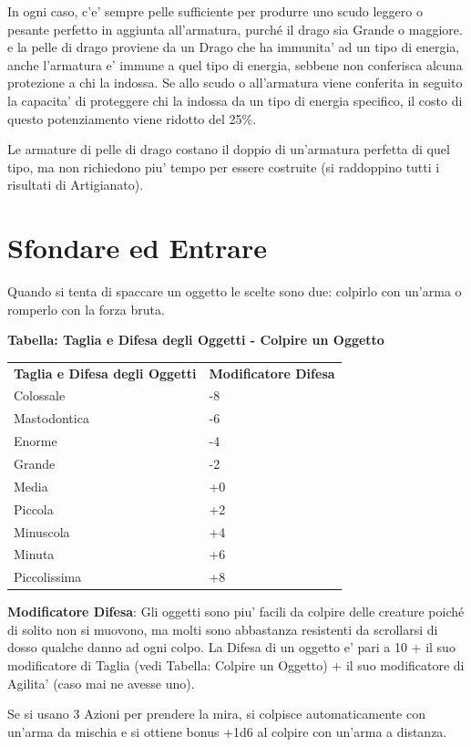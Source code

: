 \documentclass[a4paper,11pt,twoside,openany]{book}
\begin{document}
{In ogni caso, c'e' sempre pelle sufficiente per produrre uno scudo leggero o pesante perfetto in aggiunta all'armatura, purché il drago sia Grande o maggiore. 
e la pelle di drago proviene da un Drago che ha immunita' ad un tipo di energia, anche l'armatura e' immune a quel tipo di energia, sebbene non conferisca alcuna protezione a chi la indossa. Se allo scudo o all'armatura viene conferita in seguito la capacita' di proteggere chi la indossa da un tipo di energia specifico, il costo di questo potenziamento viene ridotto del 25\%.

Le armature di pelle di drago costano il doppio di un'armatura perfetta di quel tipo, ma non richiedono piu' tempo per essere costruite (si raddoppino tutti i risultati di Artigianato).

\pagebreak

\section{Sfondare ed Entrare}

\label{sfondare-ed-entrare}

Quando si tenta di spaccare un oggetto le scelte sono due: colpirlo con un'arma o romperlo con la forza bruta.

\textbf{Tabella: Taglia e Difesa degli Oggetti - Colpire un Oggetto}
\medskip

\begin{tabular}{ll}
\toprule
\textbf{Taglia e Difesa degli Oggetti} & \textbf{Modificatore Difesa}\tabularnewline
Colossale & -8\tabularnewline
Mastodontica & -6\tabularnewline
Enorme & -4\tabularnewline
Grande & -2\tabularnewline
Media & +0\tabularnewline
Piccola & +2\tabularnewline
Minuscola & +4\tabularnewline
Minuta & +6\tabularnewline
Piccolissima & +8\tabularnewline
\end{tabular}

\bigskip

\textbf{Modificatore Difesa}: Gli oggetti sono piu' facili da colpire delle creature poiché di solito non si muovono, ma molti sono abbastanza resistenti da scrollarsi di dosso qualche danno ad ogni colpo. La Difesa di un oggetto e' pari a 10 + il suo modificatore di Taglia (vedi Tabella: Colpire un Oggetto) + il suo modificatore di Agilita' (caso mai ne avesse uno).

Se si usano 3 Azioni per prendere la mira, si colpisce automaticamente con un'arma da mischia e si ottiene bonus +1d6 al colpire con un'arma a distanza.

}
\end{document}
